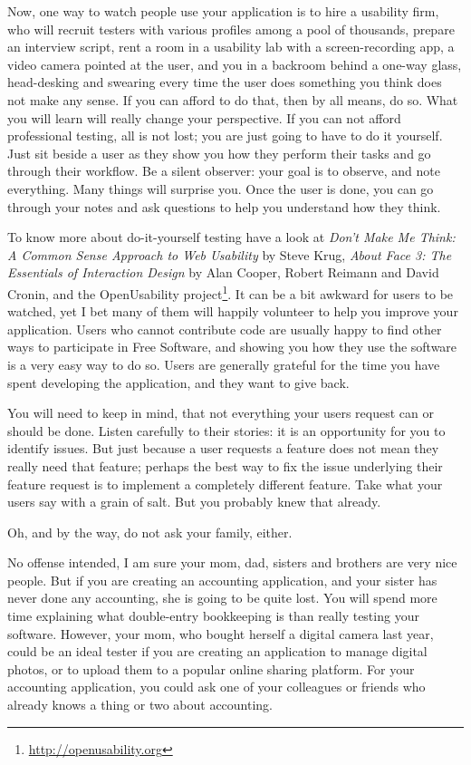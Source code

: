 Now, one way to watch people use your application is to hire a usability firm,
who will recruit testers with various profiles among a pool of thousands,
prepare an interview script, rent a room in a usability lab with a
screen-recording app, a video camera pointed at the user, and you in a
backroom behind a one-way glass, head-desking and swearing every time the user
does something you think does not make any sense. If you can afford to do that,
then by all means, do so. What you will learn will really change your
perspective. If you can not afford professional testing, all is not lost; you
are just going to have to do it yourself. Just sit beside a user as they show
you how they perform their tasks and go through their workflow. Be a silent
observer: your goal is to observe, and note everything. Many things will
surprise you. Once the user is done, you can go through your notes and ask
questions to help you understand how they think.

To know more about
do-it-yourself testing have a look at \textit{Don't Make Me Think: A Common
Sense Approach to Web Usability} by Steve Krug, \textit{About Face 3: The
Essentials of Interaction Design} by Alan Cooper, Robert Reimann and David
Cronin, and the OpenUsability project\footnote{\url{http://openusability.org}}.
It can be a bit awkward for users to be watched, yet I bet many of them will
happily volunteer to help you improve your application. Users who cannot
contribute code are usually happy to find other ways to participate in Free Software, and showing
you how they use the software is a very easy way to do so. Users are generally
grateful for the time you have spent developing the application, and they want
to give back.

You will need to keep in mind, that not everything your users request
can or should be done. Listen carefully to their stories: it is an opportunity
for you to identify issues. But just because a user requests a feature does not mean
they really need that feature; perhaps the best way to fix the issue underlying
their feature request is to implement a completely different feature. Take what
your users say with a grain of salt. But you probably knew that already. 

Oh, and by the way, do not ask your family, either.

No offense intended, I am sure your mom, dad, sisters and brothers are very nice people.
But if you are creating an accounting application, and your sister has never done any accounting,
she is going to be quite lost. You will spend more time explaining what double-entry bookkeeping is
 than really testing your software. However, your mom, who bought herself a digital camera last year,
could be an ideal tester if you are creating an application to manage digital photos, or to upload
them to a popular online sharing platform. For your accounting application, you could ask one of
your colleagues or friends who already knows a thing or two about accounting.

